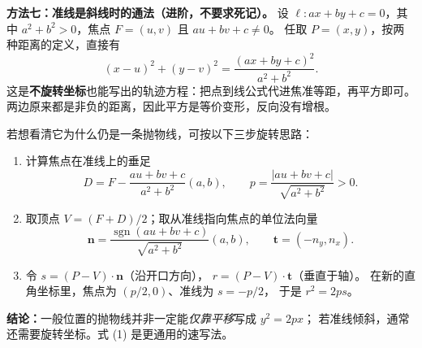 \begin{proofbox}
\textbf{方法七：准线是斜线时的通法（进阶，不要求死记）。}
设 $\ell:ax+by+c=0$，其中 $a^2+b^2>0$，焦点 $F=(u,v)$ 且 $au+bv+c\ne0$。
任取 $P=(x,y)$，按两种距离的定义，直接有
\[
\boxed{(x-u)^2+(y-v)^2
=\frac{(ax+by+c)^2}{a^2+b^2}}.
\tag{1}
\]
这是\textbf{不旋转坐标}也能写出的轨迹方程：把点到线公式代进焦准等距，再平方即可。
两边原来都是非负的距离，因此平方是等价变形，反向没有增根。

\medskip
若想看清它为什么仍是一条抛物线，可按以下三步旋转思路：
\begin{enumerate}
\item 计算焦点在准线上的垂足
\[
D=F-\frac{au+bv+c}{a^2+b^2}(a,b),\qquad
p=\frac{|au+bv+c|}{\sqrt{a^2+b^2}}>0.
\]
\item 取顶点 $V=(F+D)/2$；取从准线指向焦点的单位法向量
\[
\boldsymbol n=\frac{\operatorname{sgn}(au+bv+c)}{\sqrt{a^2+b^2}}(a,b),
\qquad \boldsymbol t=(-n_y,n_x).
\]
\item 令 $s=(P-V)\cdot\boldsymbol n$（沿开口方向），
$r=(P-V)\cdot\boldsymbol t$（垂直于轴）。
在新的直角坐标里，焦点为 $(p/2,0)$、准线为 $s=-p/2$，
于是 $\boxed{r^2=2ps}$。
\end{enumerate}
\textbf{结论：}一般位置的抛物线并非一定能\emph{仅靠平移}写成 $y^2=2px$；
若准线倾斜，通常还需要旋转坐标。式 (1) 是更通用的速写法。
\end{proofbox}
